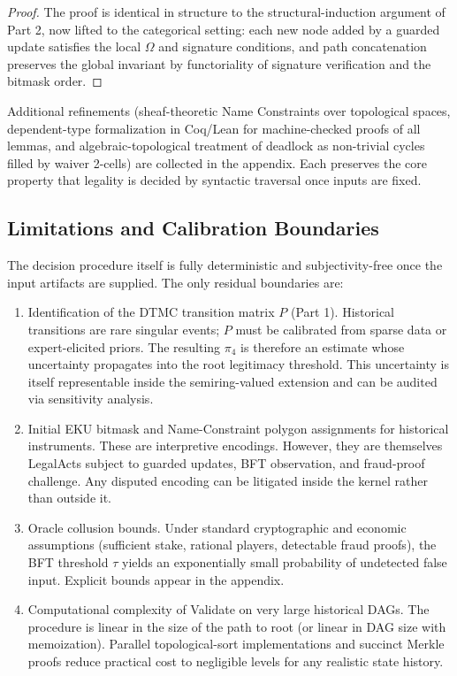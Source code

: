 \documentclass[11pt,a4paper]{article}
\begin{document}
\begin{proof}
The proof is identical in structure to the structural-induction argument of Part 2, now lifted to the categorical setting: each new node added by a guarded update satisfies the local \(\Omega\) and signature conditions, and path concatenation preserves the global invariant by functoriality of signature verification and the bitmask order.
\end{proof}

Additional refinements (sheaf-theoretic Name Constraints over topological spaces, dependent-type formalization in Coq/Lean for machine-checked proofs of all lemmas, and algebraic-topological treatment of deadlock as non-trivial cycles filled by waiver 2-cells) are collected in the appendix. Each preserves the core property that legality is decided by syntactic traversal once inputs are fixed.

\subsection{Limitations and Calibration Boundaries}

The decision procedure itself is fully deterministic and subjectivity-free once the input artifacts are supplied. The only residual boundaries are:

\begin{enumerate}
\item Identification of the DTMC transition matrix \(P\) (Part 1). Historical transitions are rare singular events; \(P\) must be calibrated from sparse data or expert-elicited priors. The resulting \(\pi_4\) is therefore an estimate whose uncertainty propagates into the root legitimacy threshold. This uncertainty is itself representable inside the semiring-valued extension and can be audited via sensitivity analysis.

\item Initial EKU bitmask and Name-Constraint polygon assignments for historical instruments. These are interpretive encodings. However, they are themselves LegalActs subject to guarded updates, BFT observation, and fraud-proof challenge. Any disputed encoding can be litigated inside the kernel rather than outside it.

\item Oracle collusion bounds. Under standard cryptographic and economic assumptions (sufficient stake, rational players, detectable fraud proofs), the BFT threshold \(\tau\) yields an exponentially small probability of undetected false input. Explicit bounds appear in the appendix.

\item Computational complexity of Validate on very large historical DAGs. The procedure is linear in the size of the path to root (or linear in DAG size with memoization). Parallel topological-sort implementations and succinct Merkle proofs reduce practical cost to negligible levels for any realistic state history.
\end{enumerate}
\end{document}
